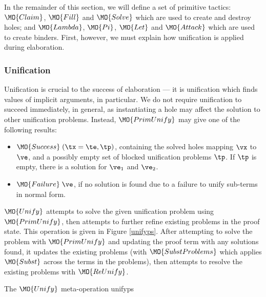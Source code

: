 In the remainder of this section, we will define a set of primitive tactics:
$\MO{Claim}$, $\MO{Fill}$ and $\MO{Solve}$ which are used to create and destroy
holes; and $\MO{Lambda}$, $\MO{Pi}$, $\MO{Let}$ and $\MO{Attack}$ which are
used to create binders. First, however, we must explain how unification is
applied during elaboration.

\subsubsection{Unification}

Unification is crucial to the success of elaboration --- it is unification
which finds values of implicit arguments, in particular. We do not require
unification to succeed immediately, in general, as instantiating a hole may 
affect the solution to other unification problems. Instead, 
$\MO{PrimUnify}$ may give one of the following results:

\begin{itemize}
\item $\MO{Success}\;(\tx=\te, \tp)$, containing the solved holes mapping
$\vx$ to $\ve$, and a possibly empty set of blocked unification problems $\tp$.
If $\tp$ is empty, there is a solution for $\ve_1$ and $\ve_2$. 
\item $\MO{Failure}\;\ve$, if no solution is found due to a failure to unify
sub-terms in normal form.
\end{itemize}

$\MO{Unify}$ attempts to solve the given unification problem using
$\MO{PrimUnify}$,
then attempts to further refine existing problems in the proof
state. This operation is given in Figure \ref{unifyps}. After attempting to
solve the problem with $\MO{PrimUnify}$ and updating the proof term with
any solutions found, it updates the existing problems (with $\MO{SubstProblems}$
which applies $\MO{Subst}$ across the terms in the problems), then attempts to
resolve the existing problems with $\MO{ReUnify}$.

{The $\MO{Unify}$ meta-operation}
{unifyps}


